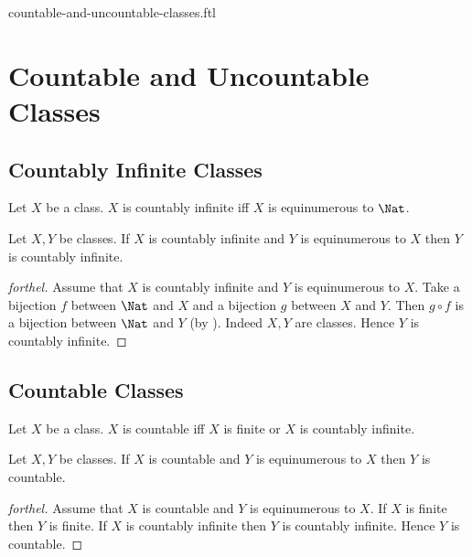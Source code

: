 \documentclass{naproche-library}
\begin{document}
\begin{smodule}{countable-and-uncountable-classes.ftl}

  \section*{Countable and Uncountable Classes}


  \subsection*{Countably Infinite Classes}

  \begin{definition}[forthel,id=FOUNDATIONS_14_6249029537103872]
    Let $X$ be a class.
    $X$ is countably infinite iff $X$ is equinumerous to $\Nat$.
  \end{definition}

  \begin{proposition}[forthel,id=FOUNDATIONS_14_803449379749888]
    Let $X, Y$ be classes.
    If $X$ is countably infinite and $Y$ is equinumerous to $X$ then $Y$ is countably infinite.
  \end{proposition}
  \begin{proof}[forthel]
    Assume that $X$ is countably infinite and $Y$ is equinumerous to $X$.
    Take a bijection $f$ between $\Nat$ and $X$ and a bijection $g$ between $X$ and $Y$.
    Then $g \circ f$ is a bijection between $\Nat$ and $Y$ (by ).
    Indeed $X, Y$ are classes.
    Hence $Y$ is countably infinite.
  \end{proof}


  \subsection*{Countable Classes}

  \begin{definition}[forthel,id=FOUNDATIONS_14_5412969443753984]
    Let $X$ be a class.
    $X$ is countable iff $X$ is finite or $X$ is countably infinite.
  \end{definition}

  \begin{proposition}[forthel,id=FOUNDATIONS_14_4182588499427328]
    Let $X, Y$ be classes.
    If $X$ is countable and $Y$ is equinumerous to $X$ then $Y$ is countable.
  \end{proposition}
  \begin{proof}[forthel]
    Assume that $X$ is countable and $Y$ is equinumerous to $X$.
    If $X$ is finite then $Y$ is finite.
    If $X$ is countably infinite then $Y$ is countably infinite.
    Hence $Y$ is countable.
  \end{proof}



\end{smodule}
\end{document}
